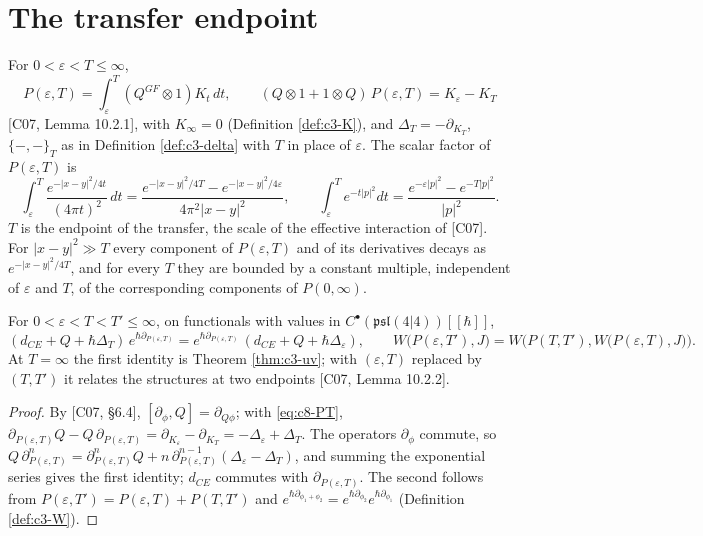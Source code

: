 \section{The transfer endpoint}

\begin{definition}
\label{def:c8-PT}
For $0<\varepsilon<T\le\infty$,
\begin{equation}
P(\varepsilon,T)=\int_\varepsilon^T(Q^{GF}\otimes1)K_t\,dt,\qquad (Q\otimes1+1\otimes Q)\,P(\varepsilon,T)=K_\varepsilon-K_T
\label{eq:c8-PT}
\end{equation}
[C07, Lemma 10.2.1], with $K_\infty=0$ (Definition \ref{def:c3-K}), and $\Delta_T=-\partial_{K_T}$, $\{-,-\}_T$ as in Definition \ref{def:c3-delta} with $T$ in place of $\varepsilon$. The scalar factor of $P(\varepsilon,T)$ is
\[
\int_\varepsilon^T\frac{e^{-|x-y|^2/4t}}{(4\pi t)^2}\,dt=\frac{e^{-|x-y|^2/4T}-e^{-|x-y|^2/4\varepsilon}}{4\pi^2|x-y|^2},\qquad \int_\varepsilon^Te^{-t|p|^2}dt=\frac{e^{-\varepsilon|p|^2}-e^{-T|p|^2}}{|p|^2}.
\]
$T$ is the endpoint of the transfer, the scale of the effective interaction of [C07]. For $|x-y|^2\gg T$ every component of $P(\varepsilon,T)$ and of its derivatives decays as $e^{-|x-y|^2/4T}$, and for every $T$ they are bounded by a constant multiple, independent of $\varepsilon$ and $T$, of the corresponding components of $P(0,\infty)$.
\end{definition}

\begin{lemma}
\label{lem:c8-transfer}
For $0<\varepsilon<T<T'\le\infty$, on functionals with values in $C^\bullet(\mathfrak{psl}(4|4))[[\hbar]]$,
\begin{equation}
(d_{CE}+Q+\hbar\Delta_T)\,e^{\hbar\partial_{P(\varepsilon,T)}}=e^{\hbar\partial_{P(\varepsilon,T)}}\,(d_{CE}+Q+\hbar\Delta_\varepsilon),\qquad W\big(P(\varepsilon,T'),J\big)=W\Big(P(T,T'),W\big(P(\varepsilon,T),J\big)\Big).
\label{eq:c8-transfer}
\end{equation}
At $T=\infty$ the first identity is Theorem \ref{thm:c3-uv}; with $(\varepsilon,T)$ replaced by $(T,T')$ it relates the structures at two endpoints [C07, Lemma 10.2.2].
\end{lemma}

\begin{proof}
By [C07, §6.4], $[\partial_\phi,Q]=\partial_{Q\phi}$; with \eqref{eq:c8-PT}, $\partial_{P(\varepsilon,T)}Q-Q\,\partial_{P(\varepsilon,T)}=\partial_{K_\varepsilon}-\partial_{K_T}=-\Delta_\varepsilon+\Delta_T$. The operators $\partial_\phi$ commute, so $Q\,\partial_{P(\varepsilon,T)}^n=\partial_{P(\varepsilon,T)}^nQ+n\,\partial_{P(\varepsilon,T)}^{n-1}(\Delta_\varepsilon-\Delta_T)$, and summing the exponential series gives the first identity; $d_{CE}$ commutes with $\partial_{P(\varepsilon,T)}$. The second follows from $P(\varepsilon,T')=P(\varepsilon,T)+P(T,T')$ and $e^{\hbar\partial_{\phi_1+\phi_2}}=e^{\hbar\partial_{\phi_2}}e^{\hbar\partial_{\phi_1}}$ (Definition \ref{def:c3-W}).
\end{proof}

